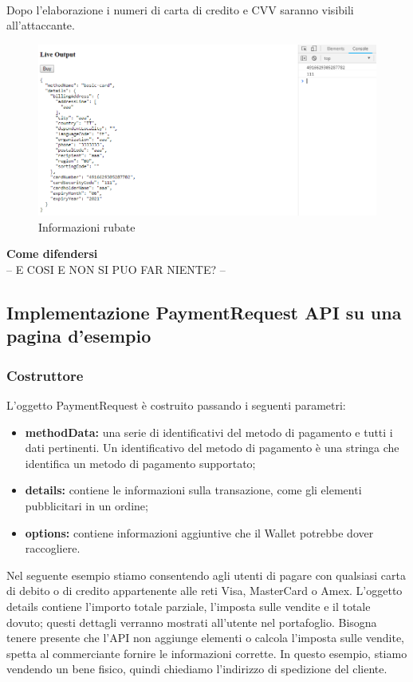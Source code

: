 \documentclass[11pt ,a4paper , twoside , openright ]{article}
\begin{document}
\pagebreak
\\
Dopo l'elaborazione i numeri di carta di credito e CVV saranno visibili all'attaccante.
\\
\begin{figure}[h]
	\centering
	\includegraphics[width=1\linewidth]{Informazioni}
	\caption{Informazioni rubate}
	\label{fig: Informazioni rubate}
\end{figure}
\textbf{Come difendersi}
\\
-- E COSI E NON SI PUO FAR NIENTE? --

\subsection{Implementazione PaymentRequest API su una pagina d'esempio}
\subsubsection{Costruttore}
L'oggetto PaymentRequest è costruito passando i seguenti parametri:
\begin{itemize}
	\item \textbf{methodData:} una serie di identificativi del metodo di pagamento e tutti i dati pertinenti. Un identificativo del metodo di pagamento è una stringa che identifica un metodo di pagamento supportato;
	\item \textbf{details:} contiene le informazioni sulla transazione, come gli elementi pubblicitari in un ordine;
	\item \textbf{options:} contiene informazioni aggiuntive che il Wallet potrebbe dover raccogliere.
\end{itemize}

Nel seguente esempio stiamo consentendo agli utenti di pagare con qualsiasi carta di debito o di credito appartenente alle reti Visa, MasterCard o Amex. L'oggetto details contiene l'importo totale parziale, l'imposta sulle vendite e il totale dovuto; questi dettagli verranno mostrati all'utente nel portafoglio. Bisogna tenere presente che l'API non aggiunge elementi o calcola l'imposta sulle vendite, spetta al commerciante fornire le informazioni corrette. In questo esempio, stiamo vendendo un bene fisico, quindi chiediamo l'indirizzo di spedizione del cliente.

\end{document}
